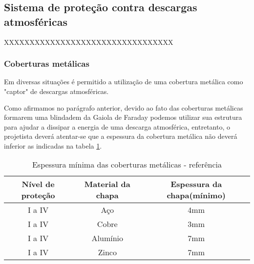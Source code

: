 \subsection{Sistema de proteção contra descargas atmosféricas} \label{subsection: spda}

XXXXXXXXXXXXXXXXXXXXXXXXXXXXXXXXX

\subsubsection{Coberturas metálicas}

Em diversas situações é permitido a utilização de uma cobertura metálica como "captor" de descargas atmosféricas.

Como afirmamos no parágrafo anterior, devido ao fato das coberturas metálicas formarem uma blindadem da Gaiola de Faraday podemos utilizar sua estrutura para ajudar a dissipar a energia de uma descarga atmosférica, entretanto, o projetista deverá atentar-se que a espessura da cobertura metálica não deverá inferior as indicadas na tabela \ref{table: espessura chapa}.

\begin{table}[ht]
	\centering
	\caption{{Espessura mínima das coberturas metálicas} - referência \cite{2015aterramento}	}
	\begin{tabular}[t]{ccc}
		\toprule
		\color{Tue-red}\textbf{Nível de proteção}&\color{Tue-red}\textbf{Material da chapa}&\color{Tue-red}\textbf{Espessura da chapa(mínimo)}\\
		\midrule
		I a IV&Aço&4mm\\
		I a IV&Cobre&3mm\\
		I a IV&Alumínio&7mm\\
		I a IV&Zinco&7mm\\
		\bottomrule
	\end{tabular}
	\label{table: espessura chapa}
\end{table}


%

%

%
\newpage
